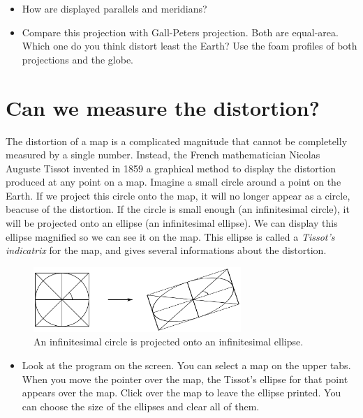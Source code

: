 \documentclass[a4paper,12pt]{article}
\begin{document}
\begin{itemize}
 \item How are displayed parallels and meridians?
 \item Compare this projection with Gall-Peters projection. Both are equal-area. Which one do you think distort least the Earth? Use the
foam profiles of both projections and the globe.
\end{itemize}



\newpage
\section{Can we measure the distortion?}
The distortion of a map is a complicated magnitude that cannot be completelly measured by a single number. Instead, the French
mathematician Nicolas Auguste Tissot invented in 1859 a graphical method to display the distortion produced at any point on a map. Imagine
a small circle around a point on the Earth. If we project this circle onto the map, it will no longer appear as a circle, beacuse of the
distortion. If the circle is small enough (an infinitesimal circle), it will be projected onto an ellipse (an infinitesimal ellipse). We
can display this ellipse magnified so we can see it on the map. This ellipse is called a \emph{Tissot's indicatrix} for the map, and gives
several informations about the distortion.
\begin{figure}[h]
 \begin{center}
  \includegraphics[width=0.7\textwidth]{tiss_diagram} 
\caption{An infinitesimal circle is projected onto an infinitesimal ellipse.}%
 \end{center}
\end{figure}
\vspace{-1em}
\begin{itemize}
 \item Look at the program on the screen. You can select a map on the upper tabs. When you move the pointer over the map, the Tissot's
ellipse for that point appears over the map. Click over the map to leave the ellipse printed. You can choose the size of the ellipses and
clear all of them.
\end{itemize}
\end{document}
